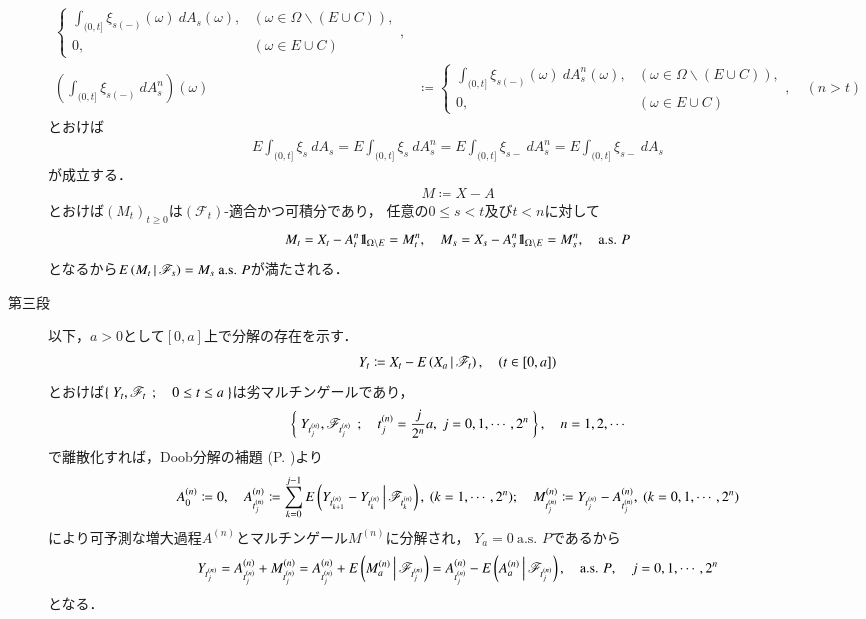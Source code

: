 \begin{prf}
\begin{description}
\begin{align}
\begin{cases}
						\displaystyle\int_{(0,t]} \xi_{s(-)}(\omega)\ dA_s(\omega), & (\omega \in \Omega \backslash (E \cup C)), \\
						0, & (\omega \in E \cup C)
					\end{cases}, \\
					\left( \int_{(0,t]} \xi_{s(-)}\ dA^n_s \right)(\omega) &\coloneqq
					\begin{cases}
						\displaystyle\int_{(0,t]} \xi_{s(-)}(\omega)\ dA^n_s(\omega), & (\omega \in \Omega \backslash (E \cup C)), \\
						0, & (\omega \in E \cup C)
					\end{cases},
					\quad (n > t)
				\end{align}
				とおけば
				\begin{align}
					E \int_{(0,t]} \xi_s\ dA_s = E \int_{(0,t]} \xi_s\ dA^n_s 
					= E \int_{(0,t]} \xi_{s-}\ dA^n_s = E \int_{(0,t]} \xi_{s-}\ dA_s
				\end{align}
				が成立する．
				\begin{align}
					M \coloneqq X - A
				\end{align}
				とおけば$(M_t)_{t \geq 0}$は$(\mathscr{F}_t)$-適合かつ可積分であり，
				任意の$0 \leq s < t$及び$t < n$に対して
				\begin{align}
					M_t = X_t - A^n_t \mbox{1}\hspace{-0.25em}\mbox{l}_{\Omega \backslash E} = M^n_t,
					\quad M_s = X_s - A^n_s \mbox{1}\hspace{-0.25em}\mbox{l}_{\Omega \backslash E} = M^n_s,
					\quad \mbox{a.s. $P$}
				\end{align}
				となるから$E\left( M_t \, \middle|\, \mathscr{F}_s \right) = M_s\ \mbox{a.s. $P$}$が満たされる．
			
			\item[第三段]
				以下，$a > 0$として$[0,a]$上で分解の存在を示す．
				\begin{align}
					Y_t \coloneqq X_t - E\left( X_a \, \middle|\, \mathscr{F}_t \right),
					\quad (t \in [0,a])
				\end{align}
				とおけば$\left\{\ Y_t,\mathscr{F}_t\ \, ; \quad 0 \leq t \leq a\ \right\}$は劣マルチンゲールであり，
				\begin{align}
					\left\{\ Y_{t^{(n)}_j},\mathscr{F}_{t^{(n)}_j}\ \, ; \quad t^{(n)}_j = \frac{j}{2^n}a,\ j=0,1,\cdots,2^n\ \right\},
					\quad n=1,2,\cdots
				\end{align}
				で離散化すれば，Doob分解の補題 (P. \pageref{lem:Doob_decomposition})より
				\begin{align}
					A^{(n)}_0 \coloneqq 0,
					\quad A^{(n)}_{t^{(n)}_j} \coloneqq \sum_{k=0}^{j-1} E\left( Y_{t^{(n)}_{k+1}} - Y_{t^{(n)}_k} \, \middle|\, \mathscr{F}_{t^{(n)}_k} \right),
					\ (k=1,\cdots,2^n);
					\quad M^{(n)}_{t^{(n)}_j} \coloneqq Y_{t^{(n)}_j} - A^{(n)}_{t^{(n)}_j},
					\ (k=0,1,\cdots,2^n)
				\end{align}
				により可予測な増大過程$A^{(n)}$とマルチンゲール$M^{(n)}$に分解され，
				$Y_a = 0\ \mbox{a.s. $P$}$であるから
				\begin{align}
					Y_{t^{(n)}_j} = A^{(n)}_{t^{(n)}_j} +  M^{(n)}_{t^{(n)}_j}
					= A^{(n)}_{t^{(n)}_j} + E\left( M^{(n)}_a \, \middle|\, \mathscr{F}_{t^{(n)}_j} \right)
					= A^{(n)}_{t^{(n)}_j} - E\left( A^{(n)}_a \, \middle|\, \mathscr{F}_{t^{(n)}_j} \right),
					\quad \mbox{a.s. $P$},
					\quad j=0,1,\cdots,2^n
				\end{align}
				となる．
				

\end{description}
\end{prf}
